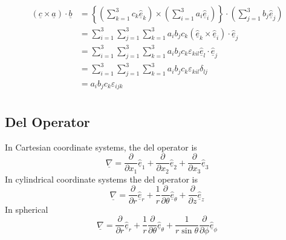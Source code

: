 \begin{equation*}
  \begin{split}
    (\underline{c}\times\underline{a})\cdot\underline{b}
    &=\left\{\left(\sum_{k=1}^{3}c_{k}\underline{\hat{e}}_{k}\right)\times\left(\sum_{i=1}^{3}a_{i}\underline{\hat{e}}_{i}\right)\right\}\cdot\left(\sum_{j=1}^{3}b_{j}\underline{\hat{e}}_{j}\right) \\
    &=\sum_{i=1}^{3}\sum_{j=1}^{3}\sum_{k=1}^{3}a_{i}b_{j}c_{k}(\underline{\hat{e}}_{k}\times\underline{\hat{e}}_{i})\cdot\underline{\hat{e}}_{j} \\
    &=\sum_{i=1}^{3}\sum_{j=1}^{3}\sum_{k=1}^{3}a_{i}b_{j}c_{k}\varepsilon_{kil}\underline{\hat{e}}_{l}\cdot\underline{\hat{e}}_{j} \\
    &=\sum_{i=1}^{3}\sum_{j=1}^{3}\sum_{k=1}^{3}a_{i}b_{j}c_{k}\varepsilon_{kil}\delta_{lj} \\
    &=a_{i}b_{j}c_{k}\varepsilon_{ijk} \\
  \end{split}
\end{equation*}

\subsection{Del Operator}

In Cartesian coordinate systems, the del operator is
\begin{equation*}
  \underline{\nabla}=\frac{\partial}{\partial{}x_{1}}\underline{\hat{e}}_{1}+\frac{\partial}{\partial{}x_{2}}\underline{\hat{e}}_{2}+\frac{\partial}{\partial{}x_{3}}\underline{\hat{e}}_{3}
\end{equation*}
In cylindrical coordinate systems the del operator is
\begin{equation*}
  \underline{\nabla}=\frac{\partial}{\partial{}r}\hat{\underline{e}}_{r}+\frac{1}{r}\frac{\partial}{\partial\theta}\hat{\underline{e}}_{\theta}+\frac{\partial}{\partial{}z}\hat{\underline{e}}_{z}
\end{equation*}
In spherical
\begin{equation*}
  \underline{\nabla}=\frac{\partial}{\partial{}r}\hat{\underline{e}}_{r}+\frac{1}{r}\frac{\partial}{\partial\theta}\hat{\underline{e}}_{\theta}+\frac{1}{r\sin\theta}\frac{\partial}{\partial\phi}\hat{\underline{e}}_{\phi}
\end{equation*}

